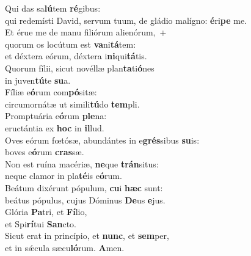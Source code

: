 \evenverse Qui das sa\textbf{lú}tem \textbf{ré}gibus:~\*\\
\evenverse qui redemísti David, servum tuum, de gládio malígno: \textbf{é}ri\textbf{pe} me.\\
\oddverse Et érue me de manu filiórum alienórum,~+\\
\oddverse  quorum os locútum est \textbf{va}ni\textbf{tá}tem:~\*\\
\oddverse et déxtera eórum, déxtera i\textbf{ni}qui\textbf{tá}tis.\\
\evenverse Quorum fílii, sicut novéllæ plan\textbf{ta}ti\textbf{ó}nes~\*\\
\evenverse in juven\textbf{tú}te \textbf{su}a.\\
\oddverse Fíliæ e\textbf{ó}rum com\textbf{pó}sitæ:~\*\\
\oddverse circumornátæ ut simili\textbf{tú}do \textbf{tem}pli.\\
\evenverse Promptuária e\textbf{ó}rum \textbf{ple}na:~\*\\
\evenverse eructántia ex \textbf{hoc} in \textbf{il}lud.\\
\oddverse Oves eórum fœtósæ, abundántes in e\textbf{grés}sibus \textbf{su}is:~\*\\
\oddverse boves e\textbf{ó}rum \textbf{cras}sæ.\\
\evenverse Non est ruína macériæ, \textbf{ne}que \textbf{trán}situs:~\*\\
\evenverse neque clamor in pla\textbf{té}is e\textbf{ó}rum.\\
\oddverse Beátum dixérunt pópulum, \textbf{cu}i \textbf{hæc} sunt:~\*\\
\oddverse beátus pópulus, cujus Dóminus \textbf{De}us \textbf{e}jus.\\
\evenverse Glória \textbf{Pa}tri, et \textbf{Fí}lio,~\*\\
\evenverse et Spi\textbf{rí}tui \textbf{San}cto.\\
\oddverse Sicut erat in princípio, et \textbf{nunc}, et \textbf{sem}per,~\*\\
\oddverse et in sǽcula sæcu\textbf{ló}rum. \textbf{A}men.\\
